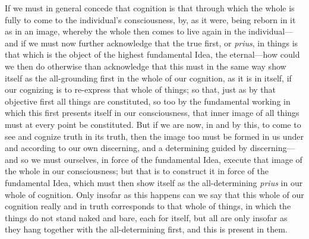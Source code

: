 \documentclass[12pt,a4paper]{book}
\begin{document}
{\small If we must in general concede that cognition is that through which the whole
is fully to come to the individual's consciousness, by, as it were, being reborn in
it as in an image, whereby the whole then comes to live again in the individual---and
if we must now further acknowledge that the true first, or \textit{prius}, in things
is that which is the object of the highest fundamental Idea, the eternal---how could
we then do otherwise than acknowledge that this must in the same way show itself as
the all-grounding first in the whole of our cognition, as it is in itself, if our
cognizing is to re-express that whole of things; so that, just as by that objective
first all things are constituted, so too by the fundamental working in which this
first presents itself in our consciousness, that inner image of all things must at
every point be constituted. But if we are now, in and by this, to come to see and
cognize truth in its truth, then the image too must be formed in us under and
according to our own discerning, and a determining guided by discerning---and so we
must ourselves, in force of the fundamental Idea, execute that image of the whole in
our consciousness; but that is to construct it in force of the fundamental Idea,
which must then show itself as the all-determining \textit{prius} in our whole of
cognition. Only insofar as this happens can we say that this whole of our cognition
really and in truth corresponds to that whole of things, in which the things do not
stand naked and bare, each for itself, but all are only insofar as they hang together
with the all-determining first, and this is present in them.\par}
\end{document}
